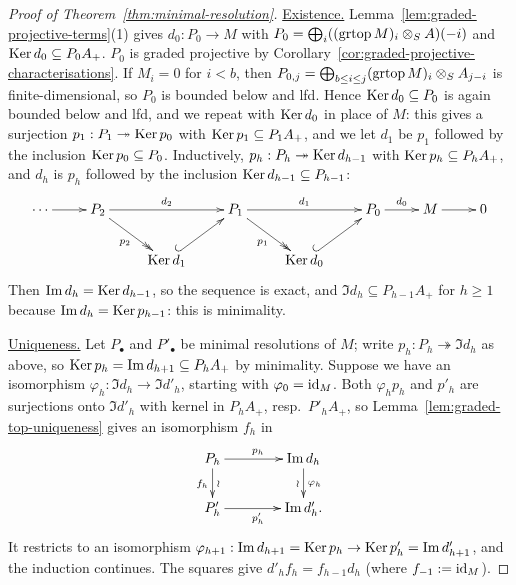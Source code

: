 \begin{supplementary}
\begin{proof}[Proof of Theorem~\ref{thm:minimal-resolution}]
\underline{Existence.}
Lemma~\ref{lem:graded-projective-terms}(1) gives $d_0:P_0\to M$ with $P_0=\bigoplus_i((\operatorname{grtop}\nolimits M)_i\otimes_SA)(-i)$ and $\operatorname{Ker}\nolimits d_0\subseteq P_0A_+$.
$P_0$ is graded projective by Corollary~\ref{cor:graded-projective-characterisations}.
If $M_i=0$ for $i<b$, then $P_{0,j}=\bigoplus_{b\leq i\leq j}(\operatorname{grtop}\nolimits M)_i\otimes_SA_{j-i}$ is finite-dimensional, so $P_0$ is bounded below and lfd.
Hence $\operatorname{Ker}\nolimits d_0\subseteq P_0$ is again bounded below and lfd, and we repeat with $\operatorname{Ker}\nolimits d_0$ in place of $M$: this gives a surjection $p_1:P_1\twoheadrightarrow\operatorname{Ker}\nolimits p_0$ with $\operatorname{Ker}\nolimits p_1\subseteq P_1A_+$, and we let $d_1$ be $p_1$ followed by the inclusion $\operatorname{Ker}\nolimits p_0\subseteq P_0$.
Inductively, $p_h:P_h\twoheadrightarrow\operatorname{Ker}\nolimits d_{h-1}$ with $\operatorname{Ker}\nolimits p_h\subseteq P_hA_+$, and $d_h$ is $p_h$ followed by the inclusion $\operatorname{Ker}\nolimits d_{h-1}\subseteq P_{h-1}$:
\[
\xymatrix@C=24pt@R=22pt{
\cdots\ar[r] & P_2\ar[rr]^{d_2}\ar@{->>}[dr]_{p_2} & & P_1\ar[rr]^{d_1}\ar@{->>}[dr]_{p_1} & & P_0\ar[r]^{d_0} & M\ar[r] & 0\\
& & \Ker d_1\ar@{^{(}->}[ur] & & \Ker d_0\ar@{^{(}->}[ur] & &
}
\]
Then $\operatorname{Im}\nolimits d_h=\operatorname{Ker}\nolimits d_{h-1}$, so the sequence is exact, and $\Im d_h\subseteq P_{h-1}A_+$ for $h\geq1$ because $\operatorname{Im}\nolimits d_h=\operatorname{Ker}\nolimits p_{h-1}$: this is minimality.

\underline{Uniqueness.}
Let $P_\bullet$ and $P'_\bullet$ be minimal resolutions of $M$; write  $p_h:P_h\twoheadrightarrow\Im d_h$ as above, so $\operatorname{Ker}\nolimits p_h=\operatorname{Im}\nolimits d_{h+1}\subseteq P_hA_+$ by minimality.
Suppose we have an isomorphism $\varphi_h:\Im d_h\to\Im d'_h$, starting with $\varphi_0=\operatorname{id}_M$.
Both $\varphi_hp_h$ and $p'_h$ are surjections onto $\Im d'_h$ with kernel in $P_hA_+$, resp.\ $P'_hA_+$, so Lemma~\ref{lem:graded-top-uniqueness} gives an isomorphism $f_h$ in
\[
\xymatrix@R=20pt@C=40pt{
P_h\ar[r]^{p_h}\ar[d]_{f_h}^{\wr} & \Im d_h\ar[d]^{\varphi_h}_{\wr}\\
P'_h\ar[r]_{p'_h} & \Im d'_h .
}
\]
It restricts to an isomorphism $\varphi_{h+1}:\operatorname{Im}\nolimits d_{h+1}=\operatorname{Ker}\nolimits p_h\to\operatorname{Ker}\nolimits p'_h=\operatorname{Im}\nolimits d'_{h+1}$, and the induction continues.
The squares give $d'_hf_h=f_{h-1}d_h$ (where $f_{-1}:=\operatorname{id}_M$).
\end{proof}
\end{supplementary}

